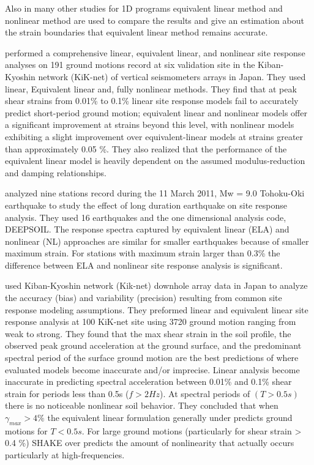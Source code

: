 Also in many other studies for 1D programs equivalent linear method and nonlinear method are used to compare the results and give an estimation about the strain boundaries that equivalent linear method remains accurate.

 \citet{Kaklamanos2015} performed a comprehensive linear, equivalent linear, and nonlinear site response analyses on 191 ground motions record at six validation site in the Kiban-Kyoshin network (KiK-net) of vertical seismometers arrays in Japan. They used linear, Equivalent linear and, fully nonlinear methods. They find that at peak shear strains from 0.01\% to 0.1\% linear site response models fail to accurately predict short-period ground motion; equivalent linear and nonlinear models offer a significant improvement at strains beyond this level, with nonlinear models exhibiting a slight improvement over equivalent-linear models at strains greater than approximately 0.05 \%. They also realized that the performance of the equivalent linear model is heavily dependent on the assumed modulus-reduction and damping relationships. 

\citet{Kim2013site} analyzed nine stations record during the 11 March 2011, Mw = 9.0 Tohoku-Oki earthquake to study the effect of long duration earthquake on site response analysis. They used 16 earthquakes and the one dimensional analysis code, DEEPSOIL. The response spectra captured by equivalent linear (ELA) and nonlinear (NL) approaches are similar for smaller earthquakes because of smaller maximum strain. For stations with maximum strain larger than 0.3\% the difference between ELA and nonlinear site response analysis is significant. 

\citet{Kaklamanos2013critical} used Kiban-Kyoshin network (Kik-net) downhole array data in Japan to analyze the accuracy (bias) and variability (precision) resulting from common site response modeling assumptions. They preformed linear and equivalent linear site response analysis at 100 KiK-net site using 3720 ground motion ranging from weak to strong. They found that the max shear strain in the soil profile, the observed peak ground acceleration at the ground surface, and the predominant spectral period of the surface ground motion are the best predictions of where evaluated models become inaccurate and/or imprecise. Linear analysis become inaccurate in predicting spectral acceleration between 0.01\% and 0.1\% shear strain for periods less than 0.5s ($f  > 2 Hz$). At spectral periods of $(T > 0.5 s)$ there is no noticeable nonlinear soil behavior. They concluded that when $\gamma_{max} > 4 \%$ the equivalent linear formulation generally under predicts ground motions for $T < 0.5 s$. For large ground motions (particularly for shear strain > 0.4 \%) SHAKE over predicts the amount of nonlinearity that actually occurs particularly at high-frequencies. 

